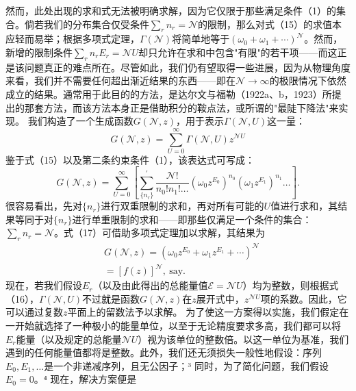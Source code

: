 然而，此处出现的求和式无法被明确求解，因为它仅限于那些满足条件（1）的集合。倘若我们的分布集合仅受条件\(\sum_{r} n_{r}=\mathcal{N}\)的限制，那么对式（15）的求值本应轻而易举；根据多项式定理，\(\Gamma(\mathcal{N})\)将简单地等于\((\omega_{0}+\omega_{1}+\cdots)^{\mathcal{N}}\)。然而，新增的限制条件\(\sum_{r} n_{r} E_{r}=\mathcal{N} U\)却只允许在求和中包含"有限"的若干项——而这正是该问题真正的难点所在。尽管如此，我们仍有望取得一些进展，因为从物理角度来看，我们并不需要任何超出渐近结果的东西——即在\(\mathcal{N} \rightarrow \infty\)的极限情况下依然成立的结果。通常用于此目的的方法，是达尔文与福勒（1922a、b，1923）所提出的那套方法，而该方法本身正是借助积分的鞍点法，或所谓的"最陡下降法"来实现。
我们构造了一个生成函数\(G(\mathcal{N},z)\)，用于表示\(\Gamma(\mathcal{N},U)\)这一量：
\begin{equation}\tag{3.2.17}\label{eq:3.2.17}
G ( \mathcal { N } , z ) = \sum _ { U = 0 } ^{\infty} \Gamma ( \mathcal { N } , U ) z ^{\mathcal { N} U }
\end{equation}
鉴于式（15）以及第二条约束条件（1），该表达式可写成：
\begin{equation}\tag{3.2.18}\label{eq:3.2.18}
G ( \mathcal { N } , z ) = \sum _ { U = 0 } ^{\infty} \left[ \sum _ { \{ n _ { r } \} } ^{\prime} \frac { \mathcal { N } ! } { n _ { 0 } ! n _ { 1 } ! \ldots } \left( \omega _ { 0 } z ^{E _ { 0} } \right) ^{n _ { 0} } \left( \omega _ { 1 } z ^{E _ { 1} } \right) ^{n _ { 1} } \ldots \right] .
\end{equation}
很容易看出，先对\(\{n_r\}\)进行双重限制的求和，再对所有可能的\(U\)值进行求和，其结果等同于对\(\{n_r\}\)进行单重限制的求和——即那些仅满足一个条件的集合：\(\sum_r n_r = \mathcal{N}\)。式（17）可借助多项式定理加以求解，其结果为
\begin{equation}\tag{3.2.19}\label{eq:3.2.19}
\begin{array}{rl} & { G ( \mathcal { N } , z ) = \left( \omega _ { 0 } z ^{E _ { 0} } + \omega _ { 1 } z ^{E _ { 1} } + \cdots \right) ^{\mathcal { N} } } \\& {  = [ f ( z ) ] ^{\mathcal { N} } , \mathrm { ~ s a y . } } \end{array}
\end{equation}
现在，若我们假设\(E_{r}\)（以及由此得出的总能量值\(\mathcal{E}=\mathcal{N}U\)）均为整数，则根据式（16），\(\Gamma(\mathcal{N},U)\)不过就是函数\(G(\mathcal{N},z)\)在\(z\)展开式中，\(z^{\mathcal{N}U}\)项的系数。因此，它可以通过复数\(z\)平面上的留数法予以求解。
为了使这一方案得以实施，我们假定在一开始就选择了一种极小的能量单位，以至于无论精度要求多高，我们都可以将\(E_{r}\)能量（以及规定的总能量\(\mathcal{N}U\)）视为该单位的整数倍。以这一单位为基准，我们遇到的任何能量值都将是整数。此外，我们还无须损失一般性地假设：序列\(E_{0}, E_{1}, \ldots\)是一个非递减序列，且无公因子；³ 同时，为了简化问题，我们假设\(E_{0} = 0\)。⁴ 现在，解决方案便是
